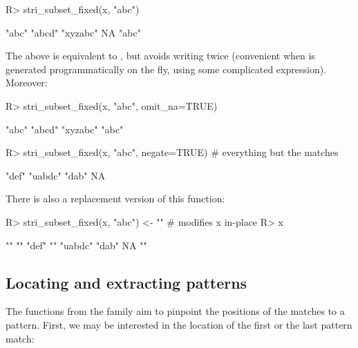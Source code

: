 \documentclass[nojss]{jss}\usepackage[]{graphicx}\usepackage[]{color}
\begin{document}
\begin{Schunk}
\begin{Sinput}
R> stri_subset_fixed(x, "abc")
\end{Sinput}
\begin{Soutput}
[1] "abc"    "abcd"   "xyzabc" NA       "abc"
\end{Soutput}
\end{Schunk}

The above is equivalent to ,
but avoids writing  twice (convenient when 
is generated programmatically on the fly, using some complicated expression).
Moreover:

\begin{Schunk}
\begin{Sinput}
R> stri_subset_fixed(x, "abc", omit_na=TRUE)
\end{Sinput}
\begin{Soutput}
[1] "abc"    "abcd"   "xyzabc" "abc"
\end{Soutput}
\begin{Sinput}
R> stri_subset_fixed(x, "abc", negate=TRUE)  # everything but the matches
\end{Sinput}
\begin{Soutput}
[1] "def"   "uabdc" "dab"   NA
\end{Soutput}
\end{Schunk}

There is also a replacement version of this function:

\begin{Schunk}
\begin{Sinput}
R> stri_subset_fixed(x, "abc") <- ""  # modifies x in-place
R> x
\end{Sinput}
\begin{Soutput}
[1] ""      ""      "def"   ""      "uabdc" "dab"   NA      ""
\end{Soutput}
\end{Schunk}





\subsection{Locating and extracting patterns}

The functions from the  family
aim to pinpoint the positions of the matches to a pattern.
First, we may be interested in the location of the first or the
last pattern match:
\end{document}
